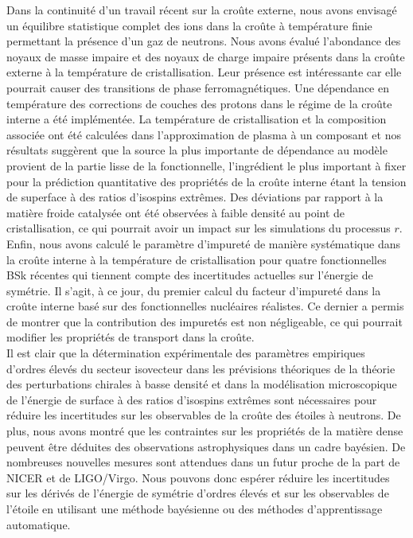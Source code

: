 Dans la continuité d'un travail récent sur la croûte externe, nous avons 
envisagé un équilibre statistique complet des ions dans la croûte à température 
finie permettant la présence d'un gaz de neutrons. Nous avons évalué 
l'abondance des noyaux de masse impaire et des noyaux de charge impaire 
présents dans la croûte externe à la température de cristallisation. 
Leur présence est intéressante car elle pourrait causer des transitions de
phase ferromagnétiques.
%
Une dépendance en température des corrections de couches des protons dans le 
régime de la croûte interne a été implémentée. La température de 
cristallisation et la composition associée ont été calculées dans 
l'approximation de plasma à un composant et nos résultats suggèrent que la 
source la plus importante de dépendance au modèle provient de la partie lisse 
de la fonctionnelle, l'ingrédient le plus important à fixer pour la 
prédiction quantitative des propriétés de la croûte interne étant la tension de 
superface à des ratios d'isospins extrêmes. 
%
Des déviations par rapport à la matière froide catalysée ont été observées à 
faible densité au point de cristallisation, ce qui pourrait avoir un 
impact sur les simulations du processus $r$. 
Enfin, nous avons calculé le paramètre d'impureté de manière systématique dans
la croûte interne à la température de cristallisation pour quatre 
fonctionnelles BSk récentes qui tiennent compte des incertitudes actuelles sur 
l'énergie de symétrie. 
Il s'agit, à ce jour, du premier calcul du facteur d'impureté dans la croûte
interne basé sur des fonctionnelles nucléaires réalistes. Ce dernier a permis
de montrer que la contribution des impuretés est non négligeable, ce qui 
pourrait modifier les propriétés de transport dans la croûte.
\\

Il est clair que la détermination expérimentale des paramètres empiriques
d'ordres élevés du secteur isovecteur dans les prévisions théoriques de 
la théorie des perturbations chirales à basse densité et dans la modélisation
microscopique de l'énergie de surface à des ratios d'isospins extrêmes 
sont nécessaires pour réduire les incertitudes sur les observables de la croûte 
des étoiles à neutrons. 
%
De plus, nous avons montré que les contraintes sur les propriétés de la matière 
dense peuvent être déduites des observations astrophysiques dans un cadre 
bayésien. 
De nombreuses nouvelles mesures sont attendues dans un futur proche de la part
de NICER et de LIGO/Virgo. 
Nous pouvons donc espérer réduire les incertitudes sur les dérivés de l'énergie 
de symétrie d'ordres élevés et sur les observables de l'étoile en utilisant une 
méthode bayésienne ou des méthodes d'apprentissage automatique. 

